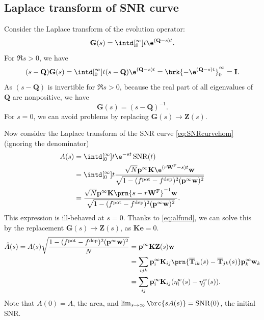 \documentclass[12pt]{article}
\newcommand{\inv}{^{-1}}
\newcommand{\I}{\mathbf{I}}
\newcommand{\onev}{\mathbf{e}}
\newcommand{\MM}{\mathbf{Q}}
\newcommand{\pr}{\mathbf{p}}
\newcommand{\eq}{\pr^\infty}
\newcommand{\fpt}{\mathbf{T}}
\newcommand{\fptb}{\overline{\fpt}}
\newcommand{\fund}{\mathbf{Z}}
\newcommand{\w}{\mathbf{w}}
\newcommand{\W}{\mathbf{W}}
\newcommand{\enc}{\mathbf{K}}
\newcommand{\frg}{\W^{\mathrm{F}}}
\newcommand{\pot}{^{\text{pot}}}
\newcommand{\dep}{^{\text{dep}}}
\DeclareMathOperator{\SNR}{SNR}
\begin{document}
\subsection{Laplace transform of SNR curve}\label{sec:laplaceSNR}

Consider the Laplace transform of the evolution operator:
%
\begin{equation}\label{eq:levol}
  \mathbf{G}(s) = \intd[_0^{\infty}]{t} \e^{(\MM-s) t}.
\end{equation}
%
For $\Re s>0$, we have
%
\begin{equation}\label{eq:levolcalc}
  (s-\MM)\mathbf{G}(s) = \intd[_0^{\infty}]{t} (s-\MM)\e^{(\MM-s) t} = \brk{-\e^{(\MM-s) t}}_0^{\infty} = \I.
\end{equation}
%
As $(s-\MM)$ is invertible for $\Re s>0$, because the real part of all eigenvalues of $\MM$ are nonpositive, we have
%
\begin{equation}\label{eq:levolres}
  \mathbf{G}(s) = (s-\MM)\inv.
\end{equation}
%
For $s=0$, we can avoid problems by replacing $\mathbf{G}(s) \to \fund(s)$.

Now consider the Laplace transform of the SNR curve \eqref{eq:SNRcurvehom} (ignoring the denominator)
%
\begin{equation}\label{eq:lsnr}
\begin{aligned}
  A(s) &= \intd[_0^{\infty}]{t} \e^{-st}\SNR(t) \\
   &= \intd[_0^{\infty}]{t} \frac{ \sqrt{N} \eq \enc \e^{(r\frg-s)t} \w }{ \sqrt{1-(f\pot-f\dep)^2(\eq\w)^2} } \\
   &= \frac{\sqrt{N} \eq \enc \prn{s - r\frg}\inv \w }{\sqrt{1-(f\pot-f\dep)^2(\eq\w)^2}}.
\end{aligned}
\end{equation}
%
This expression is ill-behaved at $s=0$.
Thanks to \eqref{eq:alfund}, we can solve this by the replacement $\mathbf{G}(s) \to \fund(s)$, as $\enc\onev=0$.
%
\begin{equation}\label{eq:larea}
\begin{aligned}
  \hat{A}(s) = A(s) \sqrt{\frac{{{1-(f\pot-f\dep)^2(\eq\w)^2}}}{N}}  &=  \eq \enc \fund(s) \w \\
    &= \sum_{ijk} \eq_i \enc_{ij} \prn{\fptb_{ik}(s)-\fptb_{jk}(s)} \eq_k \w_k \\
    &= \sum_{ij}  \eq_i \enc_{ij} (\eta^w_{i}(s) - \eta^w_{j}(s)).
\end{aligned}
\end{equation}
%
Note that $A(0)=A$, the area, and $\lim_{s\to\infty} \brc{sA(s)} = \SNR(0)$, the initial SNR.
\end{document}
